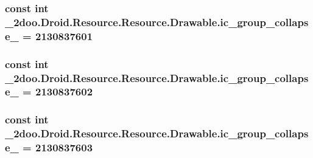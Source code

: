 \hypertarget{class__2doo_1_1_droid_1_1_resource_1_1_drawable_e11f6c4949aeccdcde0dcae54622a858}{
\subsubsection[{ic\_\-group\_\-collapse\_\-02}]{\setlength{\rightskip}{0pt plus 5cm}const int \_\-2doo.Droid.Resource.Resource.Drawable.ic\_\-group\_\-collapse\_ = 2130837601}}
\label{class__2doo_1_1_droid_1_1_resource_1_1_drawable_e11f6c4949aeccdcde0dcae54622a858}


\hypertarget{class__2doo_1_1_droid_1_1_resource_1_1_drawable_bb3d75ed0d24b097c196819dd86d2739}{
\subsubsection[{ic\_\-group\_\-collapse\_\-03}]{\setlength{\rightskip}{0pt plus 5cm}const int \_\-2doo.Droid.Resource.Resource.Drawable.ic\_\-group\_\-collapse\_ = 2130837602}}
\label{class__2doo_1_1_droid_1_1_resource_1_1_drawable_bb3d75ed0d24b097c196819dd86d2739}


\hypertarget{class__2doo_1_1_droid_1_1_resource_1_1_drawable_1687003331bc28276daedefdf94e8f43}{
\subsubsection[{ic\_\-group\_\-collapse\_\-04}]{\setlength{\rightskip}{0pt plus 5cm}const int \_\-2doo.Droid.Resource.Resource.Drawable.ic\_\-group\_\-collapse\_ = 2130837603}}
\label{class__2doo_1_1_droid_1_1_resource_1_1_drawable_1687003331bc28276daedefdf94e8f43}


